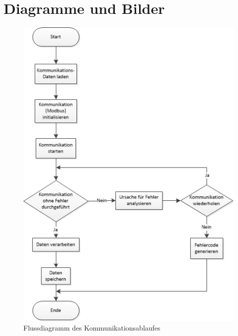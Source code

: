 \documentclass[Bachelorarbeit.tex]{subfiles}
\begin{document}
\chapter{Diagramme und Bilder}
\label{doc:anhang_a}
\begin{figure}
\includegraphics[width=1\textwidth]{./img/Flussdiagramm.png}
\caption{Flussdiagramm des Kommunikationsablaufes}
\label{pic:flussdiagramm_kommunikation}
\end{figure}
\end{document}
